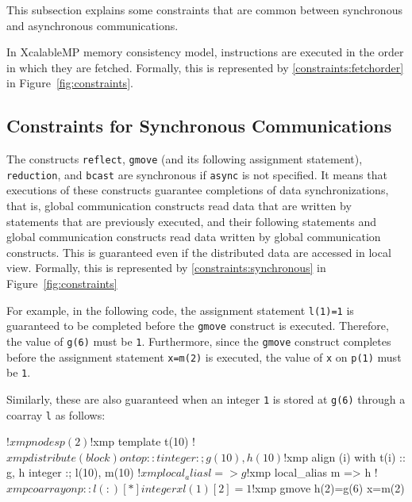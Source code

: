 This subsection explains some constraints that are common between
synchronous and asynchronous communications.

In XcalableMP memory consistency model, instructions are executed in
the order in which they are fetched.  Formally, this is represented by
\ref{constraints:fetchorder} in Figure~\ref{fig:constraints}.

\subsection{Constraints for Synchronous Communications}

The constructs \texttt{reflect}, \texttt{gmove} (and its following
assignment statement), \texttt{reduction}, and \texttt{bcast} are
synchronous if \texttt{async} is not specified.  It means that
executions of these constructs guarantee completions of data
synchronizations, that is, global communication constructs read data
that are written by statements that are previously executed, and their
following statements and global communication constructs read data
written by global communication constructs.  This is guaranteed even
if the distributed data are accessed in local view.  Formally, this is
represented by \ref{constraints:synchronous} in
Figure~\ref{fig:constraints}

For example, in the following code, the assignment statement \texttt{l(1)=1} is
guaranteed to be completed before the \texttt{gmove} construct is
executed.  Therefore, the value of \texttt{g(6)} must be \texttt{1}.
Furthermore, since the \texttt{gmove} construct completes before the
assignment statement \texttt{x=m(2)} is executed, the value of \texttt{x} on
\texttt{p(1)} must be \texttt{1}.
\begin{center}
\end{center}

Similarly, these are also guaranteed when an integer \texttt{1} is
stored at \texttt{g(6)} through a coarray \texttt{l} as follows:
\begin{center}
\begin{XFexample}
!$xmp nodes p(2)
!$xmp template t(10)
!$xmp distribute (block) onto p :: t
      integer :; g(10), h(10)
!$xmp align (i) with t(i) :: g, h
      integer :; l(10), m(10)
!$xmp local_alias l => g
!$xmp local_alias m => h
!$xmp coarray on p :: l(:)[*]
      integer x

      l(1)[2]=1
!$xmp gmove
      h(2)=g(6)
      x=m(2)
\end{XFexample}
\end{center}

